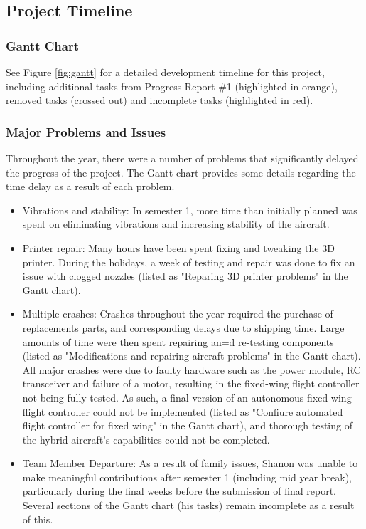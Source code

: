 \subsection{Project Timeline}
\subsubsection*{Gantt Chart}
\label{sec:gantt}
See Figure \ref{fig:gantt} for a detailed development timeline for this project, including additional tasks from Progress Report \#1 (highlighted in orange), removed tasks (crossed out) and incomplete tasks (highlighted in red). 

\subsubsection*{Major Problems and Issues}
Throughout the year, there were a number of problems that significantly delayed the progress of the project. The Gantt chart provides some details regarding the time delay as a result of each problem.
\begin{itemize}
	\item Vibrations and stability: In semester 1, more time than initially planned was spent on eliminating vibrations and increasing stability of the aircraft. 
	
	\item Printer repair: Many hours have been spent fixing and tweaking the 3D printer.  During the holidays, a week of testing and repair was done to fix an issue with clogged nozzles (listed as "Reparing 3D printer problems" in the Gantt chart). 
	
	\item Multiple crashes: Crashes throughout the year required the purchase of replacements parts, and corresponding delays due to shipping time. Large amounts of time were then spent repairing an=d re-testing components (listed as "Modifications and repairing aircraft problems" in the Gantt chart). All major crashes were due to faulty hardware such as the power module, RC transceiver and failure of a motor, resulting in the fixed-wing flight controller not being fully tested. As such, a final version of an autonomous fixed wing flight controller could not be implemented (listed as "Confiure automated flight controller for fixed wing" in the Gantt chart), and thorough testing of the hybrid aircraft's capabilities could not be completed. 
	
	\item Team Member Departure: As a result of family issues, Shanon was unable to make meaningful contributions after semester 1 (including mid year break), particularly during the final weeks before the submission of final report. Several sections of the Gantt chart (his tasks) remain incomplete as a result of this.
\end{itemize}


